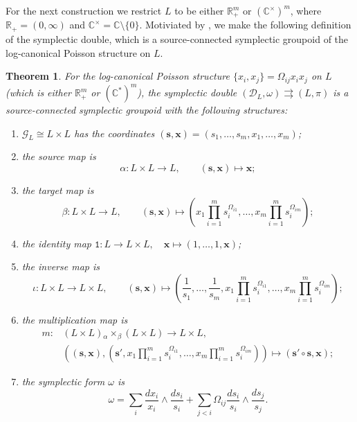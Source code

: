 \documentclass{amsart}
\newtheorem{theorem}{Theorem}[section]
\numberwithin{equation}{section}
\newcommand{\bfs}{\mathbf{s}}
\newcommand{\bfx}{\mathbf{x}}
\newcommand{\cG}{\mathcal{G}}
\renewcommand{\cD}{\mathcal{D}}
\newcommand{\CC}{\mathbb{C}}
\newcommand{\RR}{\mathbb{R}}
\newcommand{\rra}{\rightrightarrows}
\begin{document}
For the next construction we restrict $L$ to be either $\RR_+^m$ or $(\CC^\times)^m$, where $\RR_+ = (0, \infty)$ and $\CC^\times = \CC \setminus \{0\}$.
Motiviated by \cite{MR2470108}, we make the following definition of the symplectic double, which is a source-connected symplectic groupoid of the log-canonical Poisson structure on $L$.
\begin{theorem} \label{thm:SymDBLoc}
  \cite{MR2470108}
  For the log-canonical Poisson structure $\{x_i, x_j\} = \Omega_{ij} x_i x_j$ on $L$ (which is either $\RR_+^m$ or $(\CC^*)^m$), the \emph{symplectic double} $(\cD_L, \omega) \rra (L, \pi)$ is a source-connected symplectic groupoid with the following structures:
  \begin{enumerate}
    \item $\cG_L \cong L \times L$ has the coordinates $(\bfs, \bfx) = (s_1, \ldots, s_m, x_1, \ldots, x_m)$;
    \item the source map is
      \[\alpha: L \times L \to L, \qquad (\bfs, \bfx) \mapsto \bfx;\]
    \item the target map is
      \[\beta: L \times L \to L, \qquad (\bfs, \bfx) \mapsto \left(x_1 \prod_{i=1}^m s_i^{\Omega_{i1}}, \ldots, x_m \prod_{i=1}^m s_i^{\Omega_{im}}\right);\]
	\item the identity map $\mathtt{1}: L \to L \times L, \quad \bfx \mapsto (1, \ldots, 1, \bfx)$;
    \item the inverse map is
      \[\iota: L \times L \to L \times L, \qquad (\bfs, \bfx) \mapsto \left(\frac{1}{s_1}, \ldots, \frac{1}{s_m}, x_1 \prod_{i=1}^m s_i^{\Omega_{i1}}, \ldots, x_m \prod_{i=1}^m s_i^{\Omega_{im}}\right);\]
    \item the multiplication map is
      \[\begin{aligned}
	  m: & \left(L \times L\right) {_\alpha \times_\beta} \left(L \times L\right) \to L \times L, \\
	     & \left((\bfs, \bfx), \left(\bfs', x_1 \prod_{i=1}^m s_i^{\Omega_{i1}}, \ldots, x_m \prod_{i=1}^m s_i^{\Omega_{im}}\right)\right) \mapsto (\bfs' \circ \bfs, \bfx );
        \end{aligned}\]
    \item the symplectic form $\omega$ is
      \begin{equation} 
        \label{eq:2-formG_X}
	\omega = \sum_{i} \frac{dx_i}{x_i} \wedge \frac{ds_i}{s_i} + \sum_{j < i} \Omega_{ij} \frac{ds_i}{s_i} \wedge \frac{ds_j}{s_j}.
      \end{equation}
  \end{enumerate}
\end{theorem}
\end{document}
